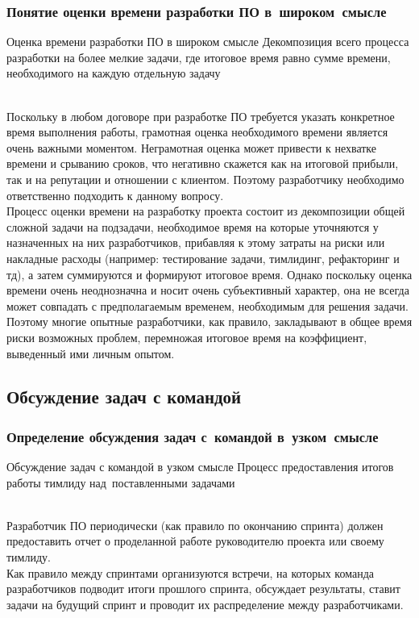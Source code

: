 \documentclass[lecturenotes]{../industrial-development}
\begin{document}
\begin{frame} \frametitle{Понятие оценки времени разработки ПО в~широком~смысле}
	\begin{block}{Оценка времени разработки ПО в широком смысле}
		Декомпозиция всего процесса разработки на более мелкие задачи, где итоговое время равно сумме времени, необходимого на каждую отдельную задачу
	\end{block}{}
\end{frame}
\lecturenotes
\\Поскольку в любом договоре при разработке ПО требуется указать конкретное время выполнения работы, грамотная оценка необходимого времени является очень важными моментом. Неграмотная оценка может привести к нехватке времени и срыванию сроков, что негативно скажется как на итоговой прибыли, так и на репутации и отношении с клиентом. Поэтому разработчику необходимо ответственно подходить к данному вопросу.\\ 
Процесс оценки времени на разработку проекта состоит из декомпозиции общей сложной задачи на подзадачи, необходимое время на которые уточняются у назначенных на них разработчиков, прибавляя к этому затраты на риски или накладные расходы (например: тестирование задачи, тимлидинг, рефакторинг и тд), а затем суммируются и формируют итоговое время. Однако поскольку оценка времени очень неоднозначна и носит очень субъективный характер, она не всегда может совпадать с предполагаемым временем, необходимым для решения задачи. Поэтому многие опытные разработчики, как правило, закладывают в общее время риски возможных проблем, перемножая итоговое время на коэффициент, выведенный ими личным опытом.

\subsection{Обсуждение задач с командой}
\begin{frame} \frametitle{Определение обсуждения задач с~командой в~узком~смысле}
	\begin{block}{Обсуждение задач с командой в узком смысле}
		Процесс предоставления итогов работы тимлиду над~поставленными задачами
	\end{block}
\end{frame}
\lecturenotes
\\Разработчик ПО периодически (как правило по окончанию спринта) должен предоставить отчет о проделанной работе руководителю проекта или своему тимлиду.\\
Как правило между спринтами организуются встречи, на которых команда разработчиков подводит итоги прошлого спринта, обсуждает результаты, ставит задачи на будущий спринт и проводит их распределение между разработчиками.
\end{document}
